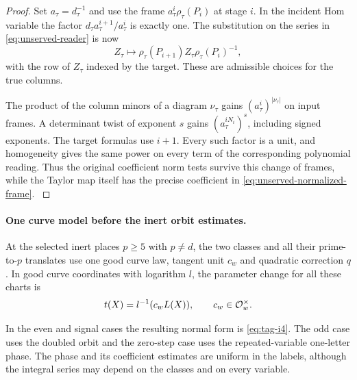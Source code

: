 \begin{proof}

Set \(a_\tau=d_\tau^{-1}\) and use the frame
\(a_\tau^i\rho_\tau(P_i)\) at stage \(i\). In the incident
Hom variable the factor
\(d_\tau a_\tau^{i+1}/a_\tau^i\) is exactly one. The substitution
on the series in \eqref{eq:unserved-reader} is now
\begin{equation}\label{eq:unserved-normalized-frame}
 Z_\tau\longmapsto
    \rho_\tau(P_{i+1}) Z_\tau\rho_\tau(P_i)^{-1},
\end{equation}
with the row of \(Z_\tau\) indexed by the target. These are
admissible choices for the true columns.

The product of the
column minors of a diagram \(\nu_\tau\) gains
\((a_\tau^i)^{|\nu_\tau|}\) on input frames. A determinant twist
of exponent \(s\) gains \((a_\tau^{iN_i})^s\), including signed
exponents. The target formulas use \(i+1\). Every such factor
is a unit, and homogeneity gives the same power on every term
of the corresponding polynomial reading. Thus the original
coefficient norm tests survive this change of frames, while the
Taylor map itself has the precise coefficient in
\eqref{eq:unserved-normalized-frame}. \label{cor:unserved-kernel-charts-2}

\end{proof}

\paragraph{One curve model before the inert orbit estimates.}
\begin{proposition}\label{prop:unserved-common-inert-model}
At the selected inert places \(p\ge5\) with \(p\ne d\), the two classes and all their prime-to-\(p\) translates use one good curve law, tangent unit \(c_w\) and quadratic correction \(q\). In good curve coordinates with logarithm \(l\), the parameter change for all these charts is
\[
 t(X)=l^{-1}(c_w L(X)),\qquad c_w\in{\cal O}_w^\times.
\]

In the even and signal cases the resulting normal form is
\textup{\eqref{eq:tag-i4}}. The odd case uses the doubled orbit and
the zero-step case uses the repeated-variable one-letter
phase. The phase and its coefficient estimates are uniform
in the labels, although the integral series may depend
on the classes and on every variable.
\end{proposition}

